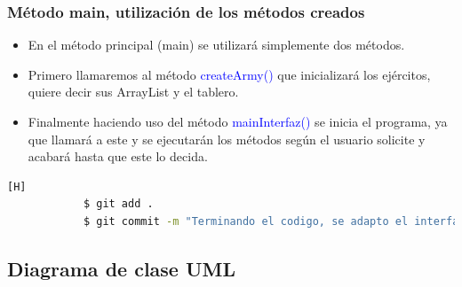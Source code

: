 \documentclass{article}
\begin{document}
        \subsubsection{Método main, utilización de los métodos creados}
        
        \begin{itemize}
            \item En el método principal (main) se utilizará simplemente dos métodos.
            \item Primero llamaremos al método \textcolor{blue}{createArmy()} que inicializará los ejércitos, quiere decir sus ArrayList y el tablero.
            \item Finalmente haciendo uso del método \textcolor{blue}{mainInterfaz()} se inicia el programa, ya que llamará a este y se ejecutarán los métodos según el usuario solicite y acabará hasta que este lo decida.
        \end{itemize}
        
        
        
        
        \begin{lstlisting}[language=bash,caption={Commit \href{https://github.com/hernanchoquehuanca/fp2-23b/commit/5410f630dc5c356dbbbf0e370259d000622a6ea7}{5410f63}: Último commit, donde se implementó el método de la interfaz, sobre el cual está puesto los métodos del programa}][H]
    		$ git add .
    		$ git commit -m "Terminando el codigo, se adapto el interfaz al metodo main y se concluyo el metodo del mismo
    	\end{lstlisting}
     
\newpage
        \subsection{Diagrama de clase UML}
\end{document}
